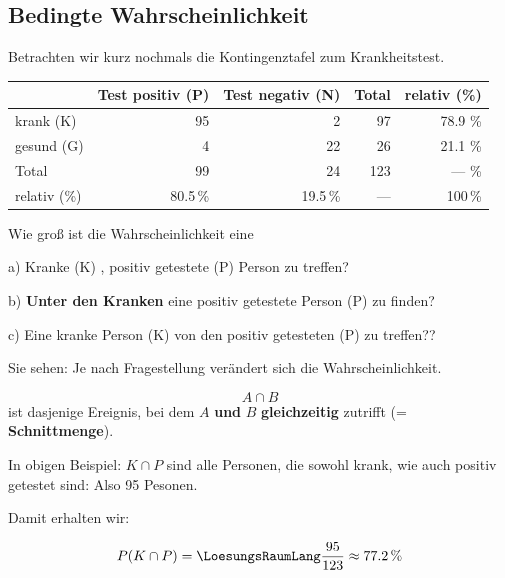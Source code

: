 
\subsection{Bedingte Wahrscheinlichkeit}

Betrachten wir kurz nochmals die Kontingenztafel zum Krankheitstest.


  \begin{tabular}{|l|r|r|r|r|}\hline
                    & Test positiv (P) & Test negativ (N) & Total & relativ (\%) \\\hline
    krank (K)       & 95               & 2                & 97    & 78.9 \%      \\\hline    
    gesund (G)      & 4                & 22               & 26    & 21.1 \%      \\\hline
    Total           & 99               & 24               & 123   &  --- \%      \\\hline
    relativ (\%)    & 80.5\,\%           & 19.5\,\%           & ---   &   100\,\%      \\\hline
  \end{tabular}



Wie groß ist die Wahrscheinlichkeit eine

a) Kranke (K) , positiv getestete (P) Person zu treffen? 

b) \textbf{Unter den Kranken} eine positiv getestete Person (P) zu finden? 

c) Eine kranke Person (K) von den positiv getesteten (P) zu treffen?? 

Sie sehen: Je nach Fragestellung verändert sich die Wahrscheinlichkeit.


\begin{definition}{}{}
$$A\cap B$$ ist dasjenige Ereignis, bei dem $A$ \textbf{und} $B$
\textbf{gleichzeitig} zutrifft (= \textbf{Schnittmenge}).
\end{definition}

In obigen Beispiel: $K \cap P$ sind alle Personen, die sowohl
krank, wie auch positiv getestet sind: Also 95 Pesonen.

Damit erhalten wir:

$$P(K\cap P) = \LoesungsRaumLang{\frac{95}{123} \approx 77.2\,\%}$$

